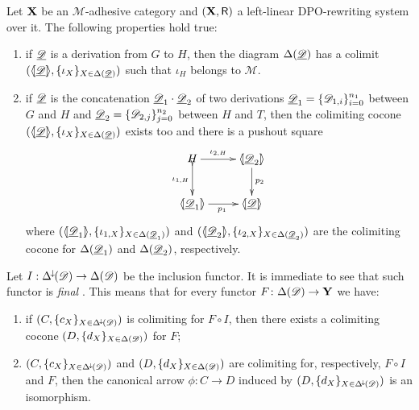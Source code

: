 \begin{lemma}\label{lem:colim}
	Let $\textbf {\textup{X}}$ be an $\mathcal{M}$-adhesive category and $(\textbf {\textup{X}}, \mathsf{R})$ a left-linear DPO-rewriting system over it. The following properties hold true:
	\begin{enumerate}
		\item  if $\underline{\mathscr{D}}$ is a derivation from $G$ to $H$, then the diagram $\Delta(\underline{\mathscr{D}})$ has a colimit $(\langle \hspace{-1.85pt}[ \underline{\mathscr{D}}]\hspace{-1.85pt}\rangle, \{\iota_X\}_{X\in \Delta(\underline{\mathscr{D}})})$ such that $\iota_H$ belongs to $\mathcal{M}$.
		\item if $\underline{\mathscr{D}}$ is the concatenation $\underline{\mathscr{D}}_1\cdot \underline{\mathscr{D}}_2$ of two derivations $\underline{\mathscr{D}}_1=\{\mathscr{D}_{1,i}\}_{i=0}^{n_1}$ between $G$ and $H$ and $\underline{\mathscr{D}}_2=\{\mathscr{D}_{2,j}\}_{j=0}^{n_2}$ between $H$ and $T$,  then the colimiting cocone $(\langle \hspace{-1.85pt}[ \underline{\mathscr{D}}]\hspace{-1.85pt}\rangle, \{\iota_X\}_{X\in \Delta(\underline{\mathscr{D}})})$ exists too and there is a pushout square
		\[\xymatrix{H\ar[r]^-{\iota_{2, H}} \ar@{>->}[d]_-{\iota_{1, H}} & \tproi{D}{2} \ar[d]^{p_2}\\  \tproi{D}{1} \ar[r]_{p_1}& \tpro{D}}\]
		where $(\langle \hspace{-1.85pt}[ \underline{\mathscr{D}}_{1}]\hspace{-1.85pt}\rangle, \{\iota_{1, X}\}_{X\in \Delta(\underline{\mathscr{D}}_1)})$ and $(\langle \hspace{-1.85pt}[ \underline{\mathscr{D}}_{2}]\hspace{-1.85pt}\rangle, \{\iota_{2, X}\}_{X\in \Delta(\underline{\mathscr{D}}_2)})$ are the colimiting cocone for $\Delta(\underline{\mathscr{D}}_1)$ and $\Delta(\underline{\mathscr{D}}_2)$, respectively.
	\end{enumerate}
\end{lemma}
\begin{remark}\label{rem:cof}
Let $I:\Delta^{\hspace{-1pt}\downarrow\hspace{-1pt}}(\mathscr{D})\to \Delta(\mathscr{D})$ be the inclusion functor. It is immediate to see that such functor is \emph{final} \cite{mac2013categories}. This means that for every functor $F\colon \Delta(\mathscr{D})\to \textbf {\textup{Y}}$ we have:
\begin{enumerate}
	\item if  $(C, \{c_X\}_{X\in \Delta^{\hspace{-1pt}\downarrow\hspace{-1pt}}(\mathscr{D})})$ is colimiting for $F\circ I$, then there exists a colimiting cocone $(D, \{d_X\}_{X\in \Delta(\mathscr{D})})$ for $F$;
	\item $(C, \{c_X\}_{X\in \Delta^{\hspace{-1pt}\downarrow\hspace{-1pt}}(\mathscr{D})})$ and $(D, \{d_X\}_{X\in \Delta(\mathscr{D})})$ are colimiting for, respectively, $F\circ I$ and $F$, then the canonical arrow $\phi\colon C\to D$ induced by $(D, \{d_X\}_{X\in \Delta^{\hspace{-1pt}\downarrow\hspace{-1pt}}(\mathscr{D})})$ is an isomorphism.
\end{enumerate}
\end{remark}

